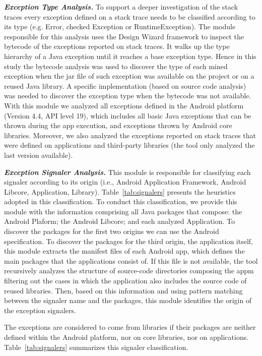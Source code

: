 \documentclass[conference]{IEEEtran}
\begin{document}
\emph{\textbf{Exception Type Analysis.}} To support a deeper investigation of the 
stack traces every exception defined on a stack trace needs to be classified according to its type
(e.g. Error, checked Exception or RuntimeException). The module responsible for this analysis 
uses the Design Wizard framework \cite{Brunet09} to inspect the bytecode of the exceptions reported 
on stack traces.  It walks up the type hierarchy of a Java exception until it reaches 
a base exception type. Hence in this study the bytecode analysis was used to discover the type 
of each mined exception when the jar file of such exception was available on the project or 
on a reused  Java library. A specific implementation (based on source code analysis)
 was needed to discover the exception type when the bytecode was not available.
With this module we analyzed all exceptions defined in the Android platform (Version 4.4, API level 19),
which includes all basic Java exceptions that can be thrown during the app execution,
and exceptions thrown by Android core libraries. Moreover, we also analyzed the 
exceptions reported on stack traces that were defined on applications and third-party libraries 
(the tool only analyzed the last version available).

\emph{\textbf{Exception Signaler Analysis.}}
This module is responsible for classifying each signaler according 
to its origin (i.e., Android Application Framework, Android Libcore, Application, Library). 
Table~\ref{tab:signalers} presents the heuristics adopted in this classification.
To conduct this classification, we provide this module with the information
comprising all Java packages that compose: the Android Plaform;
 the Android Libcore; and each analyzed Application. To discover the packages for the first two origins
we can use the Android specification.
To discover the packages for the third origin, the application itself, this module
extracts the manifest files of each Android app, which defines the main packages that the applications consist of.
 If this file is not available, the tool recursively analyzes the 
structure of source-code directories composing the appm filtering out the cases in which the application also includes the source code of reused libraries.
Then, based on this information and using pattern matching 
between the signaler name and the packages, this module identifies 
the origin of the exception signalers. 

The exceptions are considered to come
 from libraries if their packages are neither defined 
within the Android platform, nor on core libraries, nor on applications.
Table~\ref{tab:signalers} summarizes this signaler classification.
\end{document}
